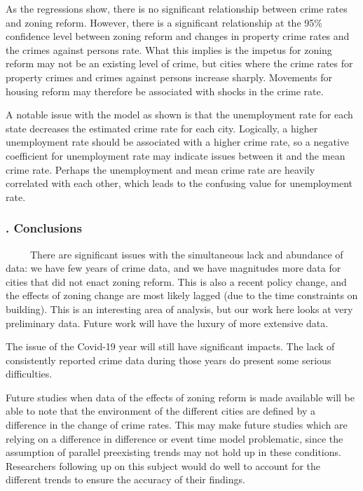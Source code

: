 \documentclass[
  12pt,
]{article}
\begin{document}
As the regressions show, there is no significant relationship between
crime rates and zoning reform. However, there is a significant
relationship at the 95\% confidence level between zoning reform and
changes in property crime rates and the crimes against persons rate.
What this implies is the impetus for zoning reform may not be an
existing level of crime, but cities where the crime rates for property
crimes and crimes against persons increase sharply. Movements for
housing reform may therefore be associated with shocks in the crime
rate.

A notable issue with the model as shown is that the unemployment rate
for each state decreases the estimated crime rate for each city.
Logically, a higher unemployment rate should be associated with a higher
crime rate, so a negative coefficient for unemployment rate may indicate
issues between it and the mean crime rate. Perhaps the unemployment and
mean crime rate are heavily correlated with each other, which leads to
the confusing value for unemployment rate.

\hypertarget{conclusions}{%
\subsubsection{. Conclusions}\label{conclusions}}

\setlength\parindent{24pt}

~~~~~There are significant issues with the simultaneous lack and
abundance of data: we have few years of crime data, and we have
magnitudes more data for cities that did not enact zoning reform. This
is also a recent policy change, and the effects of zoning change are
most likely lagged (due to the time constraints on building). This is an
interesting area of analysis, but our work here looks at very
preliminary data. Future work will have the luxury of more extensive
data.

The issue of the Covid-19 year will still have significant impacts. The
lack of consistently reported crime data during those years do present
some serious difficulties.

Future studies when data of the effects of zoning reform is made
available will be able to note that the environment of the different
cities are defined by a difference in the change of crime rates. This
may make future studies which are relying on a difference in difference
or event time model problematic, since the assumption of parallel
preexisting trends may not hold up in these conditions. Researchers
following up on this subject would do well to account for the different
trends to ensure the accuracy of their findings.
\end{document}
